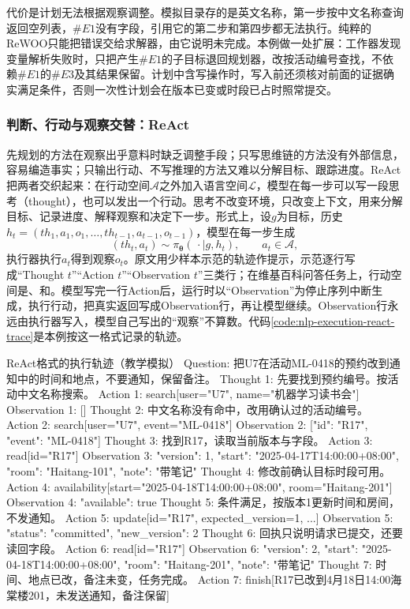 代价是计划无法根据观察调整。模拟目录存的是英文名称，第一步按中文名称查询返回空列表，$\#E1$没有字段，引用它的第二步和第四步都无法执行。纯粹的ReWOO只能把错误交给求解器，由它说明未完成。本例做一处扩展：工作器发现变量解析失败时，只把产生$\#E1$的子目标退回规划器，改按活动编号查找，不依赖$\#E1$的$\#E3$及其结果保留。计划中含写操作时，写入前还须核对前面的证据确实满足条件，否则一次性计划会在版本已变或时段已占时照常提交。

\subsubsection{判断、行动与观察交替：ReAct}
\label{sec:nlp-execution-react}

先规划的方法在观察出乎意料时缺乏调整手段；只写思维链的方法没有外部信息，容易编造事实；只输出行动、不写推理的方法又难以分解目标、跟踪进度。ReAct把两者交织起来：在行动空间$\mathcal{A}$之外加入语言空间$\mathcal{L}$，模型在每一步可以写一段思考（thought），也可以发出一个行动。思考不改变环境，只改变上下文，用来分解目标、记录进度、解释观察和决定下一步。形式上，设$g$为目标，历史$h_t=(\mathit{th}_1,a_1,o_1,\ldots,\mathit{th}_{t-1},a_{t-1},o_{t-1})$，模型在每一步生成
\[
 (\mathit{th}_t,a_t)\sim\pi_{\bm{\theta}}(\,\cdot\mid g,h_t),\qquad a_t\in\mathcal{A},
\]
执行器执行$a_t$得到观察$o_t$。原文用少样本示范的轨迹作提示，示范逐行写成“Thought $t$”“Action $t$”“Observation $t$”三类行；在维基百科问答任务上，行动空间是、和。模型写完一行Action后，运行时以“Observation”为停止序列中断生成，执行行动，把真实返回写成Observation行，再让模型继续。Observation行永远由执行器写入，模型自己写出的“观察”不算数。代码\ref{code:nlp-execution-react-trace}是本例按这一格式记录的轨迹。

\begin{codeblock}[label={code:nlp-execution-react-trace}]{ReAct格式的执行轨迹（教学模拟）}
Question: 把U7在活动ML-0418的预约改到通知中的时间和地点，不要通知，保留备注。
Thought 1: 先要找到预约编号。按活动中文名称搜索。
Action 1: search[user="U7", name="机器学习读书会"]
Observation 1: []
Thought 2: 中文名称没有命中，改用确认过的活动编号。
Action 2: search[user="U7", event="ML-0418"]
Observation 2: [{"id": "R17", "event": "ML-0418"}]
Thought 3: 找到R17，读取当前版本与字段。
Action 3: read[id="R17"]
Observation 3: {"version": 1, "start": "2025-04-17T14:00:00+08:00",
               "room": "Haitang-101", "note": "带笔记"}
Thought 4: 修改前确认目标时段可用。
Action 4: availability[start="2025-04-18T14:00:00+08:00", room="Haitang-201"]
Observation 4: {"available": true}
Thought 5: 条件满足，按版本1更新时间和房间，不发通知。
Action 5: update[id="R17", expected_version=1, ...]
Observation 5: {"status": "committed", "new_version": 2}
Thought 6: 回执只说明请求已提交，还要读回字段。
Action 6: read[id="R17"]
Observation 6: {"version": 2, "start": "2025-04-18T14:00:00+08:00",
               "room": "Haitang-201", "note": "带笔记"}
Thought 7: 时间、地点已改，备注未变，任务完成。
Action 7: finish[R17已改到4月18日14:00海棠楼201，未发送通知，备注保留]
\end{codeblock}

